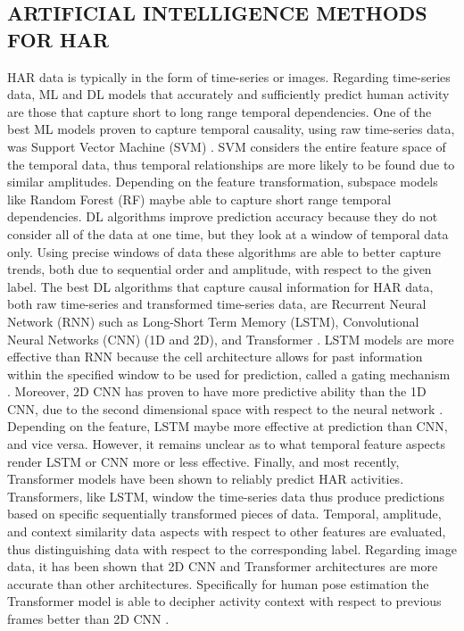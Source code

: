 \documentclass{ieeeaccess}
\begin{document}
\subsection{ARTIFICIAL INTELLIGENCE METHODS FOR HAR}
\label{ARTIFICIAL_INTELLIGENCE_METHODS_FOR_HAR}
HAR data is typically in the form of time-series or images. Regarding time-series data, ML and DL models that accurately and sufficiently predict human activity are those that capture short to long range temporal dependencies.  One of the best ML models proven to capture temporal causality, using raw time-series data, was Support Vector Machine (SVM) \cite{Anguita_2012_SVMHumanActivity, Xiao_2003_DeepLearning}. SVM considers the entire feature space of the temporal data, thus temporal relationships are more likely to be found due to similar amplitudes. Depending on the feature transformation, subspace models like Random Forest (RF) maybe able to capture short range temporal dependencies. DL  algorithms improve prediction accuracy because they do not consider all of the data at one time, but they look at a window of temporal data only. Using precise windows of data these algorithms are able to better capture trends, both due to sequential order and amplitude, with respect to the given label.  The best DL algorithms that capture causal information for HAR data, both raw time-series and transformed time-series data, are Recurrent Neural Network (RNN) such as Long-Short Term Memory (LSTM), Convolutional Neural Networks (CNN) (1D and 2D), and Transformer \cite{Xiao_2003_DeepLearning, Xia_2020_LSTMCNN, Dirgova_2022_Wearable}. LSTM models are more effective than RNN because the cell architecture allows for past information within the specified window to be used for prediction, called a gating mechanism \cite{Sarang_2021_Tensorflow2}.  Moreover, 2D CNN has proven to have more predictive ability than the 1D CNN, due to the second dimensional space with respect to the neural network \cite{Nedorubova_2021_CWT_CNN_HumanActivity}. Depending on the feature, LSTM maybe more effective at prediction than CNN, and vice versa.  However, it remains unclear as to what temporal feature aspects render LSTM or CNN more or less effective. Finally, and most recently, Transformer models have been shown to reliably predict HAR activities.  Transformers, like LSTM, window the time-series data thus produce predictions based on specific sequentially transformed pieces of data.  Temporal, amplitude, and context similarity data aspects with respect to other features are evaluated, thus distinguishing data with respect to the corresponding label. Regarding image data, it has been shown that 2D CNN and Transformer architectures are more accurate than other architectures. Specifically for human pose estimation the Transformer model is able to decipher activity context with respect to previous frames better than 2D CNN \cite{Mazzia_2022_ActionTransformer}. 
\end{document}
